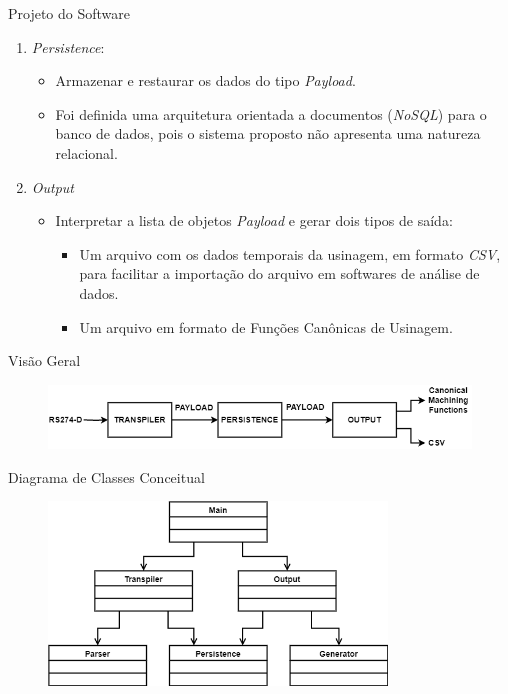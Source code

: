 \documentclass[aspectratio=169]{beamer}
\begin{document}
{\begin{frame}{Projeto do Software}
\begin{enumerate}
    \item {
      \emph{Persistence}:
      \begin{itemize}
        \item Armazenar e restaurar os dados do tipo \emph{Payload}.
        \item Foi definida uma arquitetura orientada a documentos 
              (\emph{NoSQL}) para o banco de dados, pois o sistema 
              proposto não apresenta uma natureza relacional.
      \end{itemize}
    }

    \item {
      \emph{Output}
      \begin{itemize}
        \item Interpretar a lista de objetos \emph{Payload} 
              e gerar dois tipos de saída:
        \begin{itemize}
              \item Um arquivo com os dados temporais da usinagem, 
                    em formato \emph{CSV}, para facilitar a importação 
                    do arquivo em softwares de análise de dados.
              \item Um arquivo em formato de Funções Canônicas de 
                    Usinagem.
        \end{itemize}
      \end{itemize}
    }

  \end{enumerate}
\end{frame}


\begin{frame}{Visão Geral}

  \begin{figure}[H]
    \centering
    \includegraphics[width=\textwidth]{images/idef0-main.png}
  \end{figure}

\end{frame}


\begin{frame}{Diagrama de Classes Conceitual}

  \begin{figure}[H]
    \centering
    \includegraphics[width=90mm]{images/class-main.png}
  \end{figure}


\end{frame}}
\end{document}
